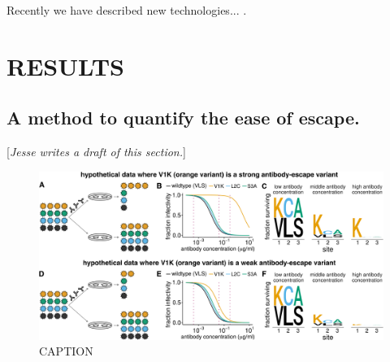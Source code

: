 \documentclass[11pt]{article}
\newcommand{\comment}[1]{{\color{red}[\textsl{#1}]}}
\begin{document}
Recently we have described new technologies... \cite{doud2017complete, dingens2017comprehensive}.


\section*{RESULTS}

\subsection*{A method to quantify the ease of escape.}
\comment{Jesse writes a draft of this section.}
\begin{figure}
\centerline{\includegraphics[width=\textwidth]{figs/fracsurvive_example/fracsurvive_fig.pdf}}
\caption{\label{fig:fracsurvive_example}
CAPTION}
\end{figure}
\end{document}
